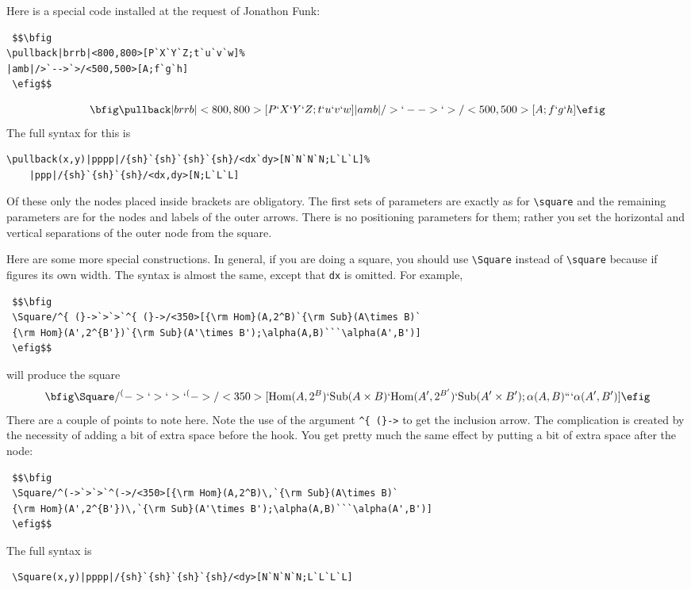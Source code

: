 \documentclass[12pt]{article}
\begin{document}
{Here is a special code installed at the request of Jonathon Funk:
\begin{verbatim}
 $$\bfig
\pullback|brrb|<800,800>[P`X`Y`Z;t`u`v`w]%
|amb|/>`-->`>/<500,500>[A;f`g`h]
 \efig$$
\end{verbatim}
 $$\bfig
\pullback|brrb|<800,800>[P`X`Y`Z;t`u`v`w]%
|amb|/>`-->`>/<500,500>[A;f`g`h]
 \efig$$
The full syntax for this is
\begin{verbatim}
\pullback(x,y)|pppp|/{sh}`{sh}`{sh}`{sh}/<dx`dy>[N`N`N`N;L`L`L]%
    |ppp|/{sh}`{sh}`{sh}/<dx,dy>[N;L`L`L]
\end{verbatim}
 Of these only the nodes placed inside brackets are obligatory.  The
first sets of parameters are exactly as for
\verb.\square.  and the
remaining parameters are for the nodes and labels of the outer arrows.
There is no positioning parameters for them; rather you set the
horizontal and vertical separations of the outer node from the square.

Here are some more special constructions.  In general, if you are doing
a square, you should use
\verb.\Square.  instead of
\verb.\square.
because if figures its own width.  The syntax is almost the same, except
that
\verb.dx.  is omitted.  For example,
\begin{verbatim}
 $$\bfig
 \Square/^{ (}->`>`>`^{ (}->/<350>[{\rm Hom}(A,2^B)`{\rm Sub}(A\times B)`
 {\rm Hom}(A',2^{B'})`{\rm Sub}(A'\times B');\alpha(A,B)```\alpha(A',B')]
 \efig$$
\end{verbatim}
 will produce the square
 $$\bfig
 \Square/^{ (}->`>`>`^{ (}->/<350>[{\rm Hom}(A,2^B)`{\rm Sub}(A\times B)`
 {\rm Hom}(A',2^{B'})`{\rm Sub}(A'\times B');\alpha(A,B)```\alpha(A',B')]
 \efig$$
 There are a couple of points to note here.  Note the use of the
argument
\index{^{ (}->}\verb.^{ (}->.  to get the inclusion arrow.  The
complication is
created by the necessity of adding a bit of extra space before the hook.
You get pretty much the same effect by putting a bit of extra space
after the node:
\begin{verbatim}
 $$\bfig
 \Square/^(->`>`>`^(->/<350>[{\rm Hom}(A,2^B)\,`{\rm Sub}(A\times B)`
 {\rm Hom}(A',2^{B'})\,`{\rm Sub}(A'\times B');\alpha(A,B)```\alpha(A',B')]
 \efig$$
\end{verbatim}
 The full syntax is
\begin{verbatim}
 \Square(x,y)|pppp|/{sh}`{sh}`{sh}`{sh}/<dy>[N`N`N`N;L`L`L`L]
\end{verbatim}

}
\end{document}
